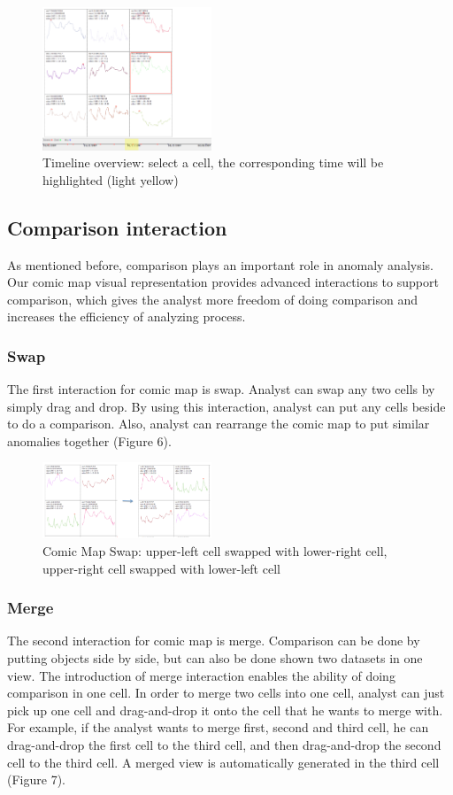 \documentclass{vgtc}                          %
\begin{document}
 \begin{figure}[htb]
	\centering
  \includegraphics[width=0.45\textwidth]{timeline2.png}
  \caption{Timeline overview: select a cell, the corresponding time will be highlighted (light yellow)}
\end{figure}

\subsection{Comparison interaction}
As mentioned before, comparison plays an important role in anomaly analysis. Our comic map visual representation provides advanced interactions to support comparison, which gives the analyst more freedom of doing comparison and increases the efficiency of analyzing process.

\subsubsection{Swap}
The first interaction for comic map is swap. Analyst can swap any two cells by simply drag and drop. By using this interaction, analyst can put any cells beside to do a comparison.  Also, analyst can rearrange the comic map to put similar anomalies together (Figure 6).  

 \begin{figure}[htb]
	\centering
  \includegraphics[width=0.45\textwidth]{swap.jpg}
  \caption{Comic Map Swap: upper-left cell swapped with lower-right cell, upper-right cell swapped with lower-left cell}
\end{figure}

\subsubsection{Merge}
The second interaction for comic map is merge. Comparison can be done by putting objects side by side, but can also be done shown two datasets in one view. The introduction of merge interaction enables the ability of doing comparison in one cell. 
In order to merge two cells into one cell, analyst can just pick up one cell and drag-and-drop it onto the cell that he wants to merge with. For example, if the analyst wants to merge first, second and third cell, he can drag-and-drop the first cell to the third cell, and then drag-and-drop the second cell to the third cell. A merged view is automatically generated in the third cell (Figure 7).
\end{document}
